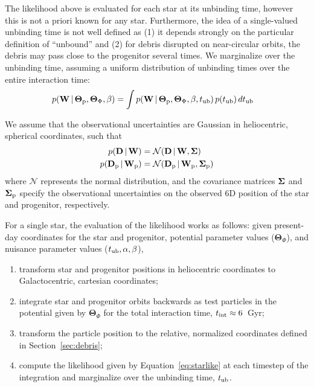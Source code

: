 \documentclass[letterpaper,12pt,preprint]{aastex}
\newcommand{\given}{\,|\,}
\newcommand{\D}{{\bf D}}
\newcommand{\W}{{\bf W}}
\newcommand{\bSigma}{{\bf \Sigma}}
\newcommand{\bs}{\boldsymbol}
\newcommand{\sat}{{\rm p}}
\newcommand{\tub}{t_{\rm ub}}
\newcommand{\tailbit}{\beta}
\newcommand{\Loffset}{\alpha}
\begin{document}
The likelihood above is evaluated for each star at its unbinding time, however this is not a priori known for any star. Furthermore, the idea of a single-valued unbinding time is not well defined as (1) it depends strongly on the particular definition of ``unbound'' and (2) for debris disrupted on near-circular orbits, the debris may pass close to the progenitor several times. We marginalize over the unbinding time, assuming a uniform distribution of unbinding times over the entire interaction time:
\begin{align}
	p(\W \given \bs{\Theta}_\sat, \bs{\Theta}_\Phi, \tailbit) &= \int p(\W \given \bs{\Theta}_\sat, \bs{\Theta}_\Phi, \tailbit, \tub)\,p(\tub)\,d\tub
\end{align}

We assume that the observational uncertainties are Gaussian in heliocentric, spherical coordinates, such that
\begin{align}
	p(\D \given \W) &= \mathcal{N}(\D \given \W, \bSigma)\label{eq:obsstar}\\
	p(\D_\sat \given \W_\sat) &= \mathcal{N}(\D_\sat \given \W_\sat, \bSigma_\sat)\label{eq:obsprog}
\end{align}
where $\mathcal{N}$ represents the normal distribution, and the covariance matrices $\bSigma$ and $\bSigma_\sat$ specify the observational uncertainties on the observed 6D position of the star and progenitor, respectively. 

For a single star, the evaluation of the likelihood works as follows: given present-day coordinates for the star and progenitor, potential parameter values ($\bs{\Theta}_\Phi$), and nuisance parameter values ($\tub,\Loffset,\tailbit$),
\begin{enumerate}
	\item transform star and progenitor positions in heliocentric coordinates to Galactocentric, cartesian coordinates;
	\item integrate star and progenitor orbits backwards as test particles in the potential given by $\bs{\Theta}_\Phi$ for the total interaction time, $t_{\rm int}\approx6$~Gyr;
	\item transform the particle position to the relative, normalized coordinates defined in Section~\ref{sec:debris};
	\item compute the likelihood given by Equation~\ref{eq:starlike} at each timestep of the integration and marginalize over the unbinding time, $\tub$.
\end{enumerate}
\end{document}
